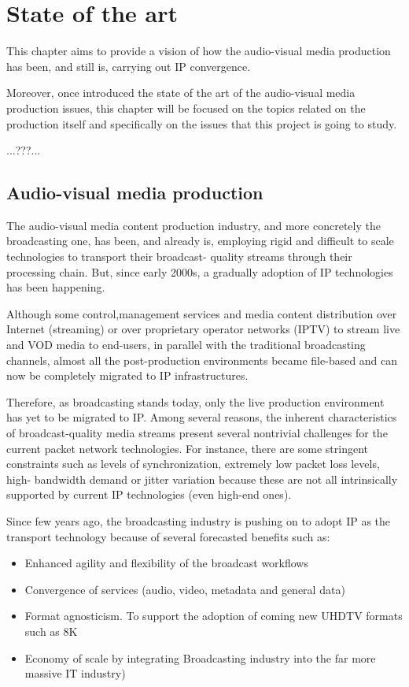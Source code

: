 \chapter{State of the art}\label{A:stateOfTheArt}

This chapter aims to provide a vision of how the audio-visual media production has been, and still is, carrying out IP convergence. 

Moreover, once introduced the state of the art of the audio-visual media production issues, this chapter will be focused on the topics related on the production itself and specifically on the issues that this project is going to study.

...???...

\section{Audio-visual media production}

The audio-visual media content production industry, and more concretely the broadcasting one, has
been, and already is, employing rigid and difficult to scale technologies to transport their broadcast-
quality streams through their processing chain. But, since early 2000s, a gradually adoption of IP
technologies has been happening.

Although some control,management services and media content distribution over Internet (streaming) or over proprietary operator networks (IPTV) to stream live and VOD media to end-users, in parallel with the traditional broadcasting channels, almost all the post-production environments became file-based and can now be completely migrated to IP infrastructures. 

Therefore, as broadcasting stands today, only the live production environment has yet to be migrated
to IP. Among several reasons, the inherent characteristics of broadcast-quality media streams present several nontrivial challenges for the current packet network technologies. For instance, there are some
stringent constraints such as levels of synchronization, extremely low packet loss levels, high-
bandwidth demand or jitter variation because these are not all intrinsically supported by current IP
technologies (even high-end ones).

Since few years ago, the broadcasting industry is pushing on to adopt IP as the transport technology because of several forecasted benefits such as:

\begin{itemize}
  \item Enhanced agility and flexibility of the broadcast workflows
  \item Convergence of services (audio, video, metadata and general data)
  \item Format agnosticism. To support the adoption of coming new UHDTV formats such as 8K 
  \item Economy of scale by integrating Broadcasting industry into the far more massive IT industry)
\end{itemize}

